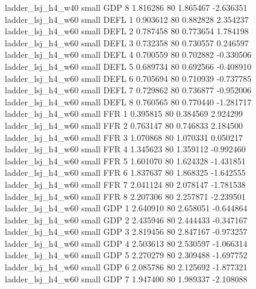        ladder_lsj_h4_w40      small      GDP                 8 1.816286 80       1.865467          -2.636351
       ladder_lsj_h4_w60      small     DEFL                 1 0.903612 80       0.882828           2.354237
       ladder_lsj_h4_w60      small     DEFL                 2 0.787458 80       0.773654           1.784198
       ladder_lsj_h4_w60      small     DEFL                 3 0.732358 80       0.730557           0.246597
       ladder_lsj_h4_w60      small     DEFL                 4 0.700559 80       0.702882          -0.330506
       ladder_lsj_h4_w60      small     DEFL                 5 0.689734 80       0.692566          -0.408910
       ladder_lsj_h4_w60      small     DEFL                 6 0.705694 80       0.710939          -0.737785
       ladder_lsj_h4_w60      small     DEFL                 7 0.729862 80       0.736877          -0.952006
       ladder_lsj_h4_w60      small     DEFL                 8 0.760565 80       0.770440          -1.281717
       ladder_lsj_h4_w60      small      FFR                 1 0.395815 80       0.384569           2.924299
       ladder_lsj_h4_w60      small      FFR                 2 0.763147 80       0.746833           2.184500
       ladder_lsj_h4_w60      small      FFR                 3 1.070868 80       1.070331           0.050217
       ladder_lsj_h4_w60      small      FFR                 4 1.345623 80       1.359112          -0.992460
       ladder_lsj_h4_w60      small      FFR                 5 1.601070 80       1.624328          -1.431851
       ladder_lsj_h4_w60      small      FFR                 6 1.837637 80       1.868325          -1.642555
       ladder_lsj_h4_w60      small      FFR                 7 2.041124 80       2.078147          -1.781538
       ladder_lsj_h4_w60      small      FFR                 8 2.207306 80       2.257871          -2.239501
       ladder_lsj_h4_w60      small      GDP                 1 2.640910 80       2.658051          -0.644864
       ladder_lsj_h4_w60      small      GDP                 2 2.435946 80       2.444433          -0.347167
       ladder_lsj_h4_w60      small      GDP                 3 2.819456 80       2.847167          -0.973257
       ladder_lsj_h4_w60      small      GDP                 4 2.503613 80       2.530597          -1.066314
       ladder_lsj_h4_w60      small      GDP                 5 2.270279 80       2.309488          -1.697752
       ladder_lsj_h4_w60      small      GDP                 6 2.085786 80       2.125692          -1.877321
       ladder_lsj_h4_w60      small      GDP                 7 1.947400 80       1.989337          -2.108088
